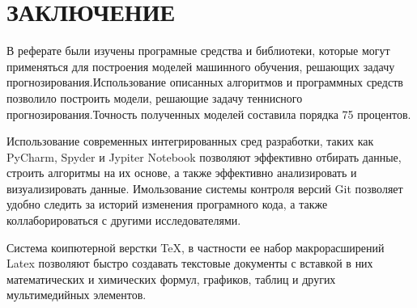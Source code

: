 \newpage\section*{ЗАКЛЮЧЕНИЕ}
В реферате были изучены програмные средства и библиотеки, которые могут применяться для построения моделей машинного обучения, решающих задачу прогнозирования.Использование описанных алгоритмов и программных средств позволило построить модели, решающие задачу теннисного прогнозирования.Точность полученных моделей составила порядка 75 процентов.

Использование современных интегрированных сред разработки, таких как PyCharm, Spyder и Jypiter Notebook позволяют эффективно отбирать данные, строить алгоритмы на их основе, а также эффективно анализировать и визуализировать данные. Имользование системы контроля версий Git позволяет удобно следить за историй изменения програмного кода, а также коллаборироваться с другими исследователями. 

Система коипютерной верстки TeX, в частности ее набор макрорасширений Latex позволяют быстро создавать текстовые документы с вставкой в них  математических и химических формул, графиков, таблиц и других мультимедийных элементов.

